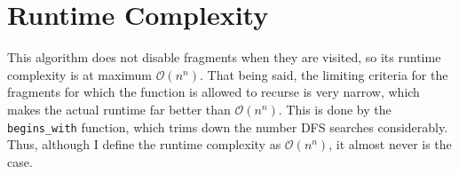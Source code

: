 \documentclass{article}
\begin{document}
\section{Runtime Complexity}
This algorithm does not disable fragments when they are visited, so
its runtime complexity is at maximum $\mathcal{O}(n^n)$. That being
said, the limiting criteria for the fragments for which the function
is allowed to recurse is very narrow, which makes the actual runtime
far better than $\mathcal{O}(n^n)$. This is done by the
\verb|begins_with| function, which trims down the number DFS searches
considerably. Thus, although I define the runtime complexity as
$\mathcal{O}(n^n)$, it almost never is the case.
\end{document}
